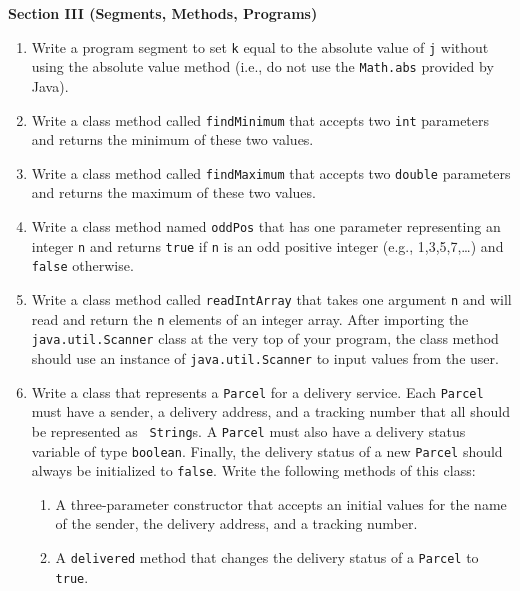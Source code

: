 \documentclass[12pt]{article}
\begin{document}
\newpage

\noindent
{\bf Section III (Segments, Methods, Programs)}

\begin{enumerate}

\item Write a program segment to set {\tt k} equal to the absolute
  value of {\tt j} without using the absolute value method (i.e., do
  not use the {\tt Math.abs} provided by Java).

\item Write a class method called {\tt findMinimum} that accepts two
  {\tt int} parameters and returns the minimum of these two values.

\item Write a class method called {\tt findMaximum} that accepts two
  {\tt double} parameters and returns the maximum of these two values.

\item Write a class method named {\tt oddPos} that has one parameter
  representing an integer {\tt n} and returns {\tt true} if
  {\tt n} is an odd positive integer (e.g., 1,3,5,7,\ldots) and {\tt
    false} otherwise.

\item Write a class method called {\tt readIntArray} that takes one
  argument {\tt n} and will read and return the {\tt n} elements of an
  integer array.  After importing the {\tt java.util.Scanner} class at
  the very top of your program, the class method should use an
  instance of {\tt java.util.Scanner} to input values from the user.

\item Write a class that represents a {\tt Parcel} for a delivery
  service.  Each {\tt Parcel} must have a sender, a delivery address,
  and a tracking number that all should be represented as {\tt
    String}s.  A {\tt Parcel} must also have a delivery status
  variable of type {\tt boolean}.  Finally, the delivery status of a
  new {\tt Parcel} should always be initialized to {\tt false}.  Write
  the following methods of this class:

  \begin{enumerate}
    \item A three-parameter constructor that accepts an initial values
      for the name of the sender, the delivery address, and a tracking
      number.

    \item A {\tt delivered} method that changes the delivery status of
      a {\tt Parcel} to {\tt true}.


\end{enumerate}
\end{enumerate}
\end{document}
